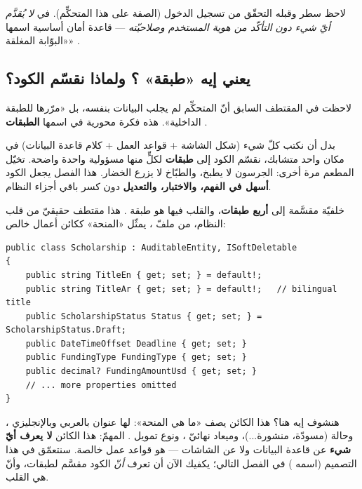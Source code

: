 \begin{secnote}
لاحظ سطر  وقبله التحقّق من تسجيل الدخول (الصفة \en{[Authorize]} على
هذا المتحكِّم). في  \emph{لا يُقدَّم أيّ شيء دون التأكّد من هوية المستخدم
وصلاحيّته} — قاعدة أمان أساسية اسمها «البوّابة المغلقة» .
\end{secnote}

\subsection{يعني إيه «طبقة» ؟ ولماذا نقسّم الكود؟}

لاحظت في المقتطف السابق أنّ المتحكِّم لم يجلب البيانات بنفسه، بل «مرّرها للطبقة
الداخلية». هذه فكرة محورية في  اسمها \textbf{الطبقات} .

\begin{idea}
بدل أن نكتب كلّ شيء (شكل الشاشة + قواعد العمل + كلام قاعدة البيانات) في مكان واحد
متشابك، نقسّم الكود إلى \textbf{طبقات} لكلٍّ منها مسؤولية واحدة واضحة. تخيّل المطعم مرة
أخرى: الجرسون لا يطبخ، والطبّاخ لا يزرع الخضار. هذا الفصل يجعل الكود \textbf{أسهل في
الفهم، والاختبار، والتعديل} دون كسر باقي أجزاء النظام.
\end{idea}

خلفيّة  مقسَّمة إلى \textbf{أربع طبقات}، والقلب فيها هو طبقة .
هذا مقتطف حقيقيّ من قلب النظام، من ملفّ ،
يمثّل «المنحة» ككائن أعمال خالص:

\begin{english}
\begin{lstlisting}[language={[Sharp]C}]
public class Scholarship : AuditableEntity, ISoftDeletable
{
    public string TitleEn { get; set; } = default!;
    public string TitleAr { get; set; } = default!;   // bilingual title
    public ScholarshipStatus Status { get; set; } = ScholarshipStatus.Draft;
    public DateTimeOffset Deadline { get; set; }
    public FundingType FundingType { get; set; }
    public decimal? FundingAmountUsd { get; set; }
    // ... more properties omitted
}
\end{lstlisting}
\end{english}

هنشوف إيه هنا؟ هذا الكائن  يصف «ما هي المنحة»: لها عنوان بالعربي
 وبالإنجليزي ، وحالة  (مسودّة، منشورة...)، وميعاد
نهائيّ ، ونوع تمويل . المهمّ: هذا الكائن \textbf{لا يعرف
أيّ شيء} عن قاعدة البيانات ولا عن الشاشات — هو قواعد عمل خالصة. سنتعمّق في هذا التصميم
(اسمه ) في الفصل التالي؛ يكفيك الآن أن تعرف \emph{أنّ} الكود
مقسَّم لطبقات، وأنّ  هي القلب.

